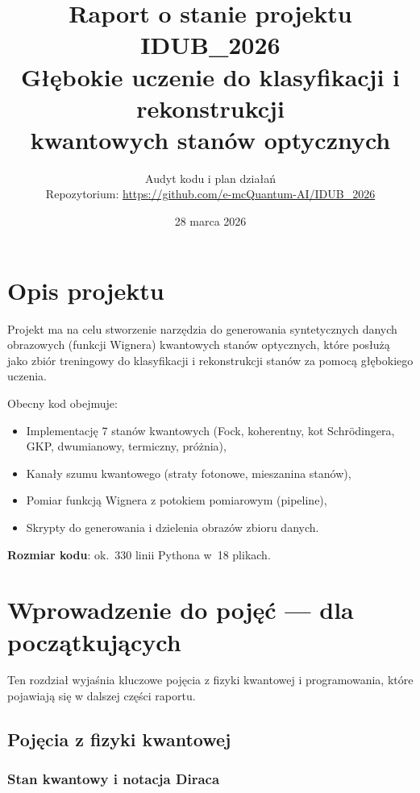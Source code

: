 \documentclass[12pt,a4paper]{article}
\title{
    \vspace{-1cm}
    {\Large Raport o stanie projektu}\\[0.5em]
    {\LARGE\bfseries IDUB\_2026}\\[0.3em]
    {\large Głębokie uczenie do klasyfikacji i rekonstrukcji\\kwantowych stanów optycznych}
}
\author{
    Audyt kodu i plan działań\\[0.3em]
    \small Repozytorium: \url{https://github.com/e-mcQuantum-AI/IDUB_2026}
}
\date{28 marca 2026}
\begin{document}
\maketitle
\thispagestyle{fancy}

\tableofcontents
\newpage

\section{Opis projektu}
\label{sec:opis}

Projekt ma na celu stworzenie narzędzia do generowania syntetycznych danych obrazowych (funkcji Wignera) kwantowych stanów optycznych, które posłużą jako zbiór treningowy do klasyfikacji i rekonstrukcji stanów za pomocą głębokiego uczenia.

Obecny kod obejmuje:
\begin{itemize}
    \item Implementację 7 stanów kwantowych (Fock, koherentny, kot Schrödingera, GKP, dwumianowy, termiczny, próżnia),
    \item Kanały szumu kwantowego (straty fotonowe, mieszanina stanów),
    \item Pomiar funkcją Wignera z potokiem pomiarowym (pipeline),
    \item Skrypty do generowania i dzielenia obrazów zbioru danych.
\end{itemize}

\noindent\textbf{Rozmiar kodu}: ok.~330 linii Pythona w~18 plikach.

\section{Wprowadzenie do pojęć --- dla początkujących}
\label{sec:pojecia}

Ten rozdział wyjaśnia kluczowe pojęcia z fizyki kwantowej i programowania, które pojawiają się w dalszej części raportu.

\subsection{Pojęcia z fizyki kwantowej}

\subsubsection{Stan kwantowy i notacja Diraca}
\end{document}
